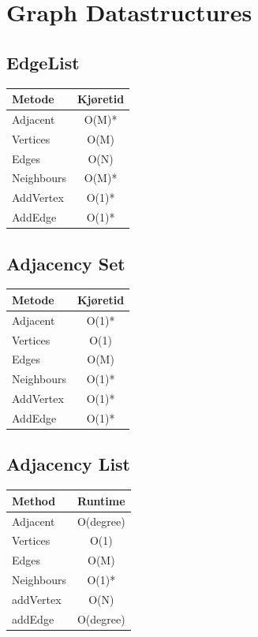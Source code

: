 \documentclass{article}
\begin{document}
\section{Graph Datastructures}
\subsection{EdgeList}
\begin{table}[!ht]
\centering
\begin{tabular}{|l|c|}
\hline
\textbf{Metode} & \textbf{Kjøretid} \\
\hline
Adjacent & O(M)* \\
\hline
Vertices & O(M) \\
\hline
Edges & O(N) \\
\hline
Neighbours & O(M)* \\
\hline
AddVertex & O(1)* \\
\hline
AddEdge & O(1)* \\
\hline
\end{tabular}
\end{table}



\subsection{Adjacency Set}
\begin{table}[!ht]
\centering
\begin{tabular}{|l|c|}
\hline
\textbf{Metode} & \textbf{Kjøretid} \\
\hline
Adjacent & O(1)* \\
\hline
Vertices & O(1) \\
\hline
Edges & O(M) \\
\hline
Neighbours & O(1)* \\
\hline
AddVertex & O(1)* \\
\hline
AddEdge & O(1)* \\
\hline
\end{tabular}
\end{table}


\subsection{Adjacency List}
\begin{table}[!ht]
\centering
\begin{tabular}{|l|c|}
\hline
\textbf{Method} & \textbf{Runtime} \\
\hline
Adjacent & O(degree) \\
\hline
Vertices & O(1) \\
\hline
Edges & O(M) \\
\hline
Neighbours & O(1)* \\
\hline
addVertex & O(N) \\
\hline
addEdge & O(degree) \\
\hline
\end{tabular}
\end{table}
\end{document}
